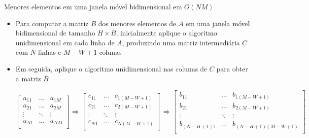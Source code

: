 \begin{frame}[fragile]{Menores elementos em uma janela móvel bidimensional em $O(NM)$}

    \begin{itemize}
        \item Para computar a matriz $B$ dos menores elementos de $A$ em uma janela móvel bidimensional
            de tamanho $H\times B$, inicialmente aplique o algoritmo unidimensional em cada linha de
            $A$, produzindo uma matriz intermediária $C$ com $N$ linhas  e $M - W + 1$ colunas

        \item Em seguida, aplique o algoritmo unidimensional nas colunas de $C$ para obter a matriz $B$

        \begin{footnotesize}
        $$
            \begin{bmatrix}
                a_{11} & \ldots & a_{1M} \\
                a_{21} & \ldots & a_{2M} \\
                \vdots & \ddots & \vdots \\
                a_{N1} & \ldots & a_{NM} \\
            \end{bmatrix}
            \Rightarrow
            \begin{bmatrix}
                c_{11} & \ldots & c_{1(M - W + 1)} \\
                c_{21} & \ldots & c_{2(M - W + 1)} \\
                \vdots & \ddots & \vdots \\
                c_{N1} & \ldots & c_{N(M - W + 1)} \\
            \end{bmatrix}
            \Rightarrow
            \begin{bmatrix}
                b_{11} & \ldots & b_{1(M - W + 1)} \\
                b_{21} & \ldots & b_{2(M - W + 1)} \\
                \vdots & \ddots & \vdots \\
                b_{(N - H + 1)1}  & \ldots & b_{(N - H + 1)(M - W + 1)} \\
            \end{bmatrix}
        $$
        \end{footnotesize}

    \end{itemize}
\end{frame}

